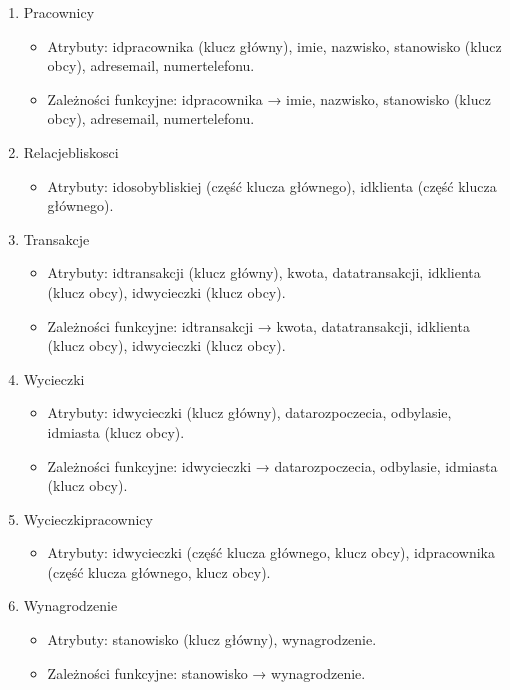\documentclass{article}
\begin{document}
\begin{enumerate}
		\item Pracownicy
		\begin{itemize}
			\item Atrybuty: id\textunderscore pracownika (klucz główny), imie, nazwisko, stanowisko (klucz obcy), adres\textunderscore email, numer\textunderscore telefonu.
			\item Zależności funkcyjne: id\textunderscore pracownika → imie, nazwisko, stanowisko (klucz obcy), adres\textunderscore email, numer\textunderscore telefonu.
		\end{itemize}
		
		\item Relacje\textunderscore bliskosci
		\begin{itemize}
			\item Atrybuty: id\textunderscore osoby\textunderscore bliskiej (część klucza głównego), id\textunderscore klienta (część klucza głównego).
		\end{itemize}
		
		\item Transakcje
		\begin{itemize}
			\item Atrybuty: id\textunderscore transakcji (klucz główny), kwota, data\textunderscore transakcji, id\textunderscore klienta (klucz obcy), id\textunderscore wycieczki (klucz obcy).
			\item Zależności funkcyjne: id\textunderscore transakcji → kwota, data\textunderscore transakcji, id\textunderscore klienta (klucz obcy), id\textunderscore wycieczki (klucz obcy).
		\end{itemize}
		
		\item Wycieczki
		\begin{itemize}
			\item Atrybuty: id\textunderscore wycieczki (klucz główny), data\textunderscore rozpoczecia, odbyla\textunderscore sie, id\textunderscore miasta (klucz obcy).
			\item Zależności funkcyjne: id\textunderscore wycieczki → data\textunderscore rozpoczecia, odbyla\textunderscore sie, id\textunderscore miasta (klucz obcy).
		\end{itemize}
		
		\item Wycieczki\textunderscore pracownicy
		\begin{itemize}
			\item Atrybuty: id\textunderscore wycieczki (część klucza głównego, klucz obcy), id\textunderscore pracownika (część klucza głównego, klucz obcy).
		\end{itemize}
		
		\item Wynagrodzenie
		\begin{itemize}
			\item Atrybuty: stanowisko (klucz główny), wynagrodzenie.
			\item Zależności funkcyjne: stanowisko → wynagrodzenie.
		\end{itemize}
		
	\end{enumerate}
	
\end{document}
